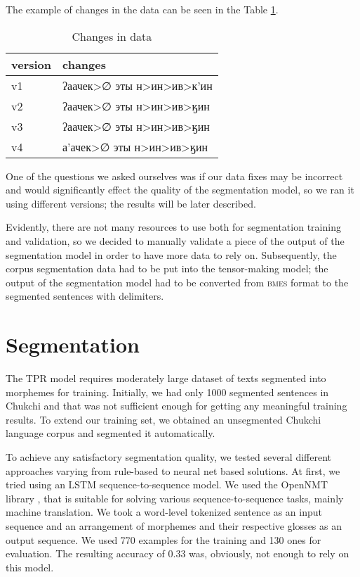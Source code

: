 \documentclass[leqno]{article}
\begin{document}
The example of changes in the data can be seen in the Table \ref{tab:datachanges}.

\begin{table}[h]
\centering
\begin{tabular}{|l|l|}
\hline
{\color[HTML]{000000} version} & {\color[HTML]{000000} changes}       \\ \hline
{\color[HTML]{000000} v1}      & {\color[HTML]{000000} ʔаачек>∅ эты н>ин>ив>к'ин} \\ \hline
{\color[HTML]{000000} v2}      & {\color[HTML]{000000} ʔаачек>∅ эты н>ин>ив>ӄин} \\ \hline
{\color[HTML]{000000} v3}      & {\color[HTML]{000000} ʔаачек>∅ эты н>ин>ив>ӄин} \\ \hline
{\color[HTML]{000000} v4}      & {\color[HTML]{000000} а'ачек>∅ эты н>ин>ив>ӄин} \\ \hline
\end{tabular}
\caption{Changes in data}
\label{tab:datachanges}
\end{table}

One of the questions we asked ourselves was if our data fixes may be incorrect and would significantly effect the quality of the segmentation model, so we ran it using different versions; the results will be later described.

Evidently, there are not many resources to use both for segmentation training and validation, so we decided to manually validate a piece of the output of the segmentation model in order to have more data to rely on. 
Subsequently, the corpus segmentation data had to be put into the tensor-making model; the output of the segmentation model had to be converted from \textsc{bmes} format to the segmented sentences with delimiters.


\section{Segmentation}
The TPR model requires moderately large dataset of texts segmented into morphemes for training. Initially, we had only 1000 segmented sentences in Chukchi and that was not sufficient enough for getting any meaningful training results. To extend our training set, we obtained an unsegmented Chukchi language corpus and segmented it automatically.

To achieve any satisfactory segmentation quality, we tested several different approaches varying from rule-based to neural net based solutions. At first, we tried using an LSTM sequence-to-sequence model. We used the OpenNMT library \parencite{klein-etal-2017-opennmt}, that is suitable for solving various sequence-to-sequence tasks, mainly machine translation. We took a word-level tokenized sentence as an input sequence and an arrangement of morphemes and their respective glosses as an output sequence. We used  770 examples for the training and 130 ones for evaluation. The resulting accuracy of 0.33 was, obviously, not enough to rely on this model.
\end{document}
